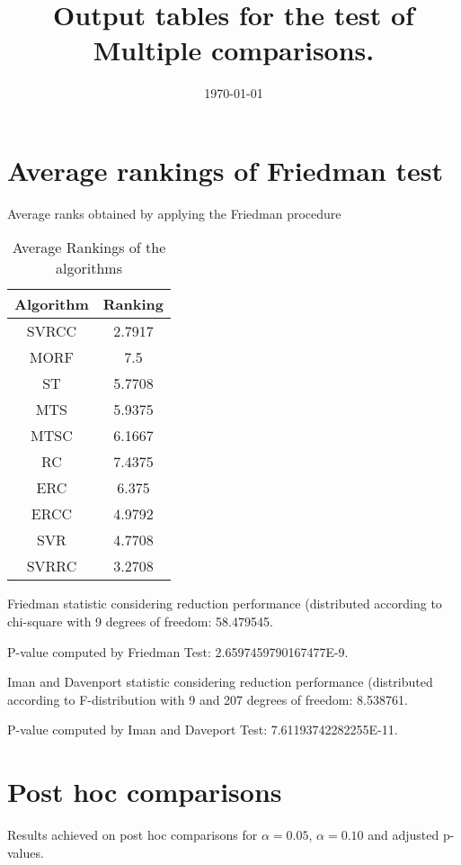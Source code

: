 \documentclass[a4paper,10pt]{article}
\title{Output tables for the test of Multiple comparisons.}
\author{}
\date{\today}
\begin{document}
\begin{landscape}
\pagestyle{empty}
\maketitle
\thispagestyle{empty}
\section{Average rankings of Friedman test}



Average ranks obtained by applying the Friedman procedure

\begin{table}[!htp]
\centering
\begin{tabular}{|c|c|}\hline
Algorithm&Ranking\\\hline
SVRCC & 2.7917\\
MORF & 7.5\\
ST & 5.7708\\
MTS & 5.9375\\
MTSC & 6.1667\\
RC & 7.4375\\
ERC & 6.375\\
ERCC & 4.9792\\
SVR & 4.7708\\
SVRRC & 3.2708\\
\hline
\end{tabular}
\caption{Average Rankings of the algorithms}
\end{table}

Friedman statistic considering reduction performance (distributed according to chi-square with 9 degrees of freedom: 58.479545.

P-value computed by Friedman Test: 2.6597459790167477E-9.\newline

Iman and Davenport statistic considering reduction performance (distributed according to F-distribution with 9 and 207 degrees of freedom: 8.538761.

P-value computed by Iman and Daveport Test: 7.61193742282255E-11.\newline



\pagebreak

\section{Post hoc comparisons}

Results achieved on post hoc comparisons for $\alpha = 0.05$, $\alpha = 0.10$ and adjusted p-values.


\end{landscape}
\end{document}
